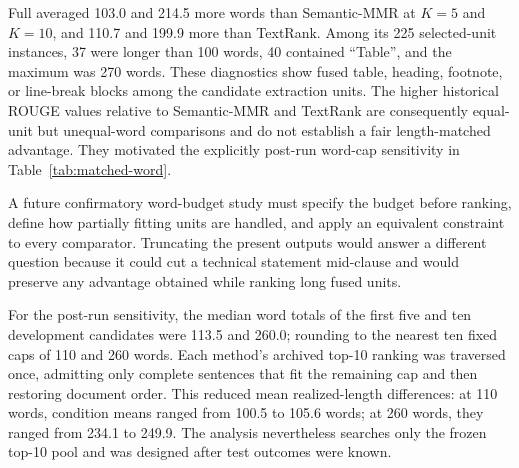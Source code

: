 \documentclass[applsci,article,submit,moreauthors]{Definitions/mdpi}
\begin{document}
Full averaged 103.0 and 214.5 more words than Semantic-MMR at $K=5$ and $K=10$, and 110.7 and 199.9 more than TextRank. Among its 225 selected-unit instances, 37 were longer than 100 words, 40 contained ``Table'', and the maximum was 270 words. These diagnostics show fused table, heading, footnote, or line-break blocks among the candidate extraction units. The higher historical ROUGE values relative to Semantic-MMR and TextRank are consequently equal-unit but unequal-word comparisons and do not establish a fair length-matched advantage. They motivated the explicitly post-run word-cap sensitivity in Table~\ref{tab:matched-word}.

A future confirmatory word-budget study must specify the budget before ranking, define how partially fitting units are handled, and apply an equivalent constraint to every comparator. Truncating the present outputs would answer a different question because it could cut a technical statement mid-clause and would preserve any advantage obtained while ranking long fused units.

For the post-run sensitivity, the median word totals of the first five and ten development candidates were 113.5 and 260.0; rounding to the nearest ten fixed caps of 110 and 260 words. Each method's archived top-10 ranking was traversed once, admitting only complete sentences that fit the remaining cap and then restoring document order. This reduced mean realized-length differences: at 110 words, condition means ranged from 100.5 to 105.6 words; at 260 words, they ranged from 234.1 to 249.9. The analysis nevertheless searches only the frozen top-10 pool and was designed after test outcomes were known.

\begin{table}[htbp]
\caption{Post-run matched-word sensitivity using equal-weight report-series estimands. The 15 reports form 10 frozen series. Intervals use 10,000 series bootstrap draws; exact values enumerate all 1024 series sign assignments and are Holm-adjusted across six contrasts.}
\label{tab:matched-word}
\centering\small
{}
\end{table}
\end{document}
